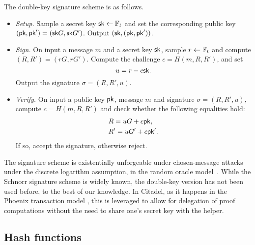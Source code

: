 The double-key signature scheme is as follows.

\begin{itemize}
	\item \emph{Setup.} Sample a secret key $\mathsf{sk} \gets \mathbb{F}_t$ and set the corresponding public key $(\mathsf{pk}, \mathsf{pk}') = (\mathsf{sk} G, \mathsf{sk} G')$. Output $(\mathsf{sk}, (\mathsf{pk}, \mathsf{pk}'))$. 
	\item \emph{Sign.} On input a message $m$ and a secret key $\mathsf{sk}$, sample $r \gets \mathbb{F}_t$ and compute $(R, R') = (rG, rG')$. Compute the challenge $c = H(m, R, R')$, and set 
	\[u = r - c \mathsf{sk}.\]
	Output the signature $\sigma = (R, R', u)$. 
	\item \emph{Verify.} On input a public key $\mathsf{pk}$, message $m$ and signature $\sigma = (R, R', u)$, compute $c = H(m, R, R')$ and check whether the following equalities hold:
	\[\begin{aligned}
		& R = uG + c \mathsf{pk}, \\
		& R' = uG' + c \mathsf{pk}'. \\
	\end{aligned}\]
	If so, accept the signature, otherwise reject.
\end{itemize}


The signature scheme is existentially unforgeable under chosen-message attacks under the discrete logarithm assumption, in the random oracle model~\cite[Section 12.5.1]{katz2020introduction}. While the Schnorr signature scheme is widely known, the double-key version has not been used before, to the best of our knowledge. In Citadel, as it happens in the Phoenix transaction model \cite{phoenix-doc}, this is leveraged to allow for delegation of proof computations without the need to share one's secret key with the helper.

\subsection{Hash functions}\label{sec:hash_functions}

